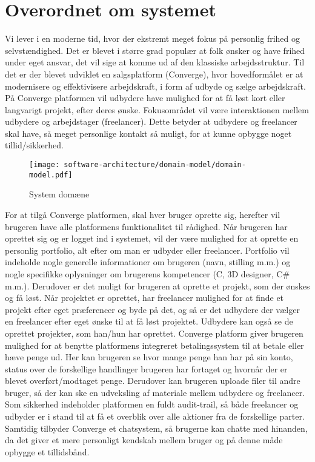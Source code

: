\chapter{Overordnet om systemet}

Vi lever i en moderne tid, hvor der ekstremt meget fokus på personlig frihed og selvstændighed. Det er blevet i større grad populær at folk ønsker og have frihed under eget ansvar, det vil sige at komme ud af den klassiske arbejdsstruktur. Til det er der blevet udviklet en salgsplatform (Converge), hvor hovedformålet er at modernisere og effektivisere arbejdskraft, i form af udbyde og sælge arbejdskraft.  På Converge platformen vil udbydere have mulighed for at få løst kort eller langvarigt projekt, efter deres ønske. Fokusområdet vil være interaktionen mellem udbydere og arbejdstager (freelancer).  Dette betyder at udbydere og freelancer skal have, så meget personlige kontakt så muligt, for at kunne opbygge noget tillid/sikkerhed. 

\begin{figure}[H]
    \begin{small}
        \begin{center}
            \texttt{[image: software-architecture/domain-model/domain-model.pdf]}
        \end{center}
        \caption{System domæne}
        \label{fig:system-domain}
    \end{small}
\end{figure}

For at tilgå Converge platformen, skal hver bruger oprette sig, herefter vil brugeren have alle platformens funktionalitet til rådighed. Når brugeren har oprettet sig og er logget ind i systemet, vil der være mulighed for at oprette en personlig portfolio, alt efter om man er udbyder eller freelancer. Portfolio vil indeholde nogle generelle informationer om brugeren (navn, stilling m.m.) og nogle specifikke oplysninger om brugerens kompetencer (C, 3D designer, C\# m.m.).  Derudover er det muligt for brugeren at oprette et projekt, som der ønskes og få løst. Når projektet er oprettet, har freelancer mulighed for at finde et projekt efter eget præferencer og byde på det, og så er det udbydere der vælger en freelancer efter eget ønske til at få løst projektet. Udbydere kan også se de oprettet projekter, som han/hun har oprettet.  Converge platform giver brugeren mulighed for at benytte platformens integreret betalingssystem til at betale eller hæve penge ud. Her kan brugeren se hvor mange penge han har på sin konto, status over de forskellige handlinger brugeren har fortaget og hvornår der er blevet overført/modtaget penge. Derudover kan brugeren uploade filer til andre bruger, så der kan ske en udveksling af materiale mellem udbydere og freelancer. Som sikkerhed indeholder platformen en fuldt audit-trail, så både freelancer og udbyder er i stand til at få et overblik over alle aktioner fra de forskellige parter. Samtidig tilbyder Converge et chatsystem, så brugerne kan chatte med hinanden, da det giver et mere personligt kendskab mellem bruger og på denne måde opbygge et tillidsbånd.   


